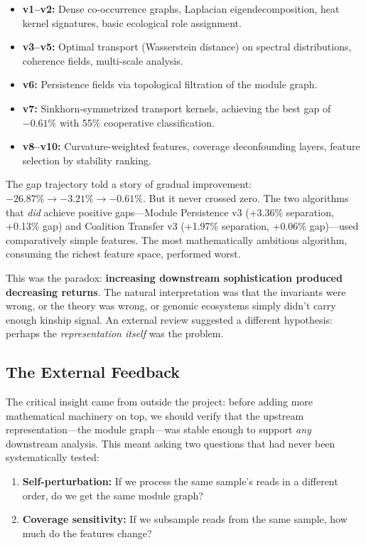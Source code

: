 \documentclass{../yalumba}
\begin{document}
\begin{itemize}[leftmargin=2em]
  \item \textbf{v1--v2:} Dense co-occurrence graphs, Laplacian eigendecomposition,
    heat kernel signatures, basic ecological role assignment.
  \item \textbf{v3--v5:} Optimal transport (Wasserstein distance) on spectral
    distributions, coherence fields, multi-scale analysis.
  \item \textbf{v6:} Persistence fields via topological filtration of the module graph.
  \item \textbf{v7:} Sinkhorn-symmetrized transport kernels, achieving the best gap
    of $-0.61\%$ with 55\% cooperative classification.
  \item \textbf{v8--v10:} Curvature-weighted features, coverage deconfounding layers,
    feature selection by stability ranking.
\end{itemize}

The gap trajectory told a story of gradual improvement: $-26.87\% \to -3.21\% \to
-0.61\%$. But it never crossed zero. The two algorithms that \textit{did} achieve
positive gaps---Module Persistence v3 (+3.36\% separation, +0.13\% gap) and
Coalition Transfer v3 (+1.97\% separation, +0.06\% gap)---used comparatively
simple features. The most mathematically ambitious algorithm, consuming the
richest feature space, performed worst.

This was the paradox: \textbf{increasing downstream sophistication produced
decreasing returns}. The natural interpretation was that the invariants were
wrong, or the theory was wrong, or genomic ecosystems simply didn't carry enough
kinship signal. An external review suggested a different hypothesis: perhaps the
\textit{representation itself} was the problem.

\subsection{The External Feedback}

The critical insight came from outside the project: before adding more mathematical
machinery on top, we should verify that the upstream representation---the module
graph---was stable enough to support \textit{any} downstream analysis. This meant
asking two questions that had never been systematically tested:

\begin{enumerate}[leftmargin=2em]
  \item \textbf{Self-perturbation:} If we process the same sample's reads in a
    different order, do we get the same module graph?
  \item \textbf{Coverage sensitivity:} If we subsample reads from the same sample,
    how much do the features change?
\end{enumerate}
\end{document}

